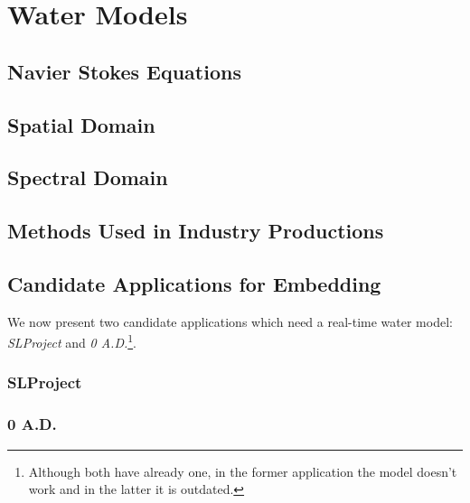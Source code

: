 \section{Water Models}\label{sec:water_models}



\subsection{Navier Stokes Equations}\label{subsec:navier_stokes}
\subsection{Spatial Domain}\label{subsec:spatial_domain}
\subsection{Spectral Domain}\label{subsec:spectral_domain}
\subsection{Methods Used in Industry Productions}\label{subsec:methods_industry}


\subsection{Candidate Applications for Embedding}\label{subsec:candidate_apps}


We now present two candidate applications which need a real-time water model:
\textit{SLProject} and \textit{0 A.D.}\footnote{Although both have already one,
in the former application the model doesn't work and in the latter it is
outdated.}.

\subsubsection{SLProject}



\subsubsection{0 A.D.}


